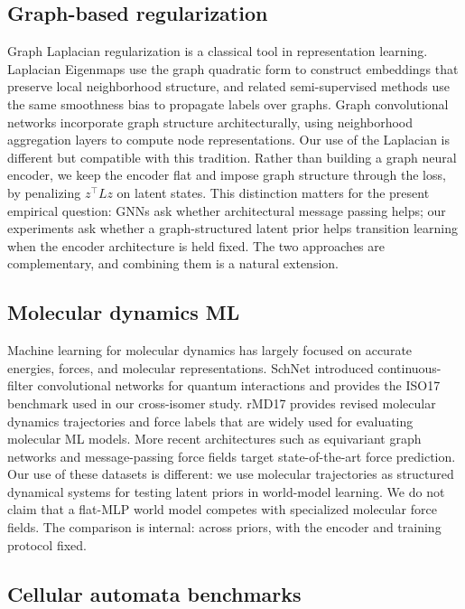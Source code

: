 \subsection{Graph-based regularization}

Graph Laplacian regularization is a classical tool in representation learning. Laplacian Eigenmaps \cite{belkin2003} use the graph quadratic form to construct embeddings that preserve local neighborhood structure, and related semi-supervised methods use the same smoothness bias to propagate labels over graphs. Graph convolutional networks \cite{kipf2017} incorporate graph structure architecturally, using neighborhood aggregation layers to compute node representations. Our use of the Laplacian is different but compatible with this tradition. Rather than building a graph neural encoder, we keep the encoder flat and impose graph structure through the loss, by penalizing \(z^\top L z\) on latent states. This distinction matters for the present empirical question: GNNs ask whether architectural message passing helps; our experiments ask whether a graph-structured latent prior helps transition learning when the encoder architecture is held fixed. The two approaches are complementary, and combining them is a natural extension.

\subsection{Molecular dynamics ML}

Machine learning for molecular dynamics has largely focused on accurate energies, forces, and molecular representations. SchNet \cite{schnet2017} introduced continuous-filter convolutional networks for quantum interactions and provides the ISO17 benchmark used in our cross-isomer study. rMD17 \cite{chmiela2017} provides revised molecular dynamics trajectories and force labels that are widely used for evaluating molecular ML models. More recent architectures such as equivariant graph networks and message-passing force fields target state-of-the-art force prediction. Our use of these datasets is different: we use molecular trajectories as structured dynamical systems for testing latent priors in world-model learning. We do not claim that a flat-MLP world model competes with specialized molecular force fields. The comparison is internal: across priors, with the encoder and training protocol fixed.

\subsection{Cellular automata benchmarks}

